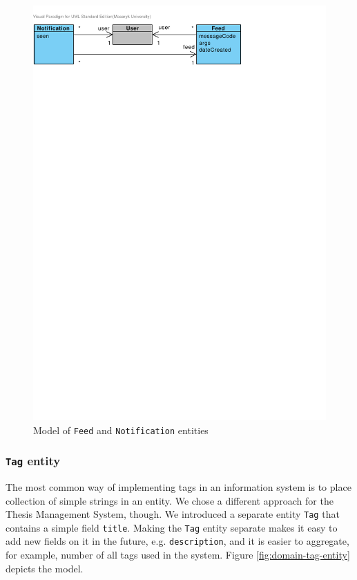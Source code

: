 \begin{figure}[h]
    \centering
        \includegraphics[trim=0 720 170 30, clip, keepaspectratio, width=\textwidth]{./images/domain-feed-notification-entities.pdf}
    \caption{Model of \texttt{Feed} and \texttt{Notification} entities}
    \label{fig:domain-feed-notification-entities}
\end{figure}

\subsubsection{\texttt{Tag} entity}

The most common way of implementing tags in an information system is to place collection of simple strings in an entity. We chose a different approach for the Thesis Management System, though. We introduced a separate entity \texttt{Tag} that contains a simple field \texttt{title}. Making the \texttt{Tag} entity separate makes it easy to add new fields on it in the future, e.g. \texttt{description}, and it is easier to aggregate, for example, number of all tags used in the system. Figure \ref{fig:domain-tag-entity} depicts the model.


